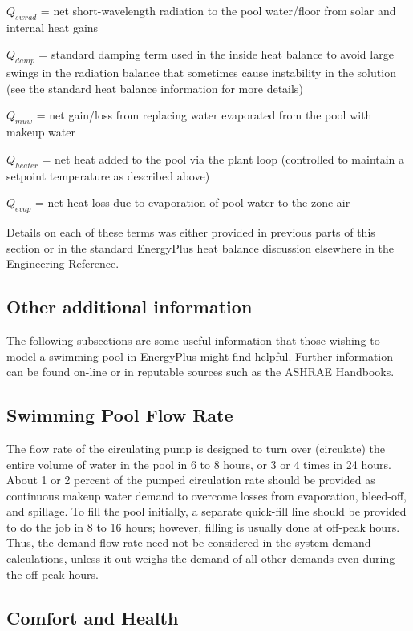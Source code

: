 \(Q_{swrad}\) = net short-wavelength radiation to the pool water/floor from solar and internal heat gains

\(Q_{damp}\) = standard damping term used in the inside heat balance to avoid large swings in the radiation balance that sometimes cause instability in the solution (see the standard heat balance information for more details)

\(Q_{muw}\) = net gain/loss from replacing water evaporated from the pool with makeup water

\(Q_{heater}\) = net heat added to the pool via the plant loop (controlled to maintain a setpoint temperature as described above)

\(Q_{evap}\) = net heat loss due to evaporation of pool water to the zone air

Details on each of these terms was either provided in previous parts of this section or in the standard EnergyPlus heat balance discussion elsewhere in the Engineering Reference.

\subsection{Other additional information}\label{other-additional-information}

The following subsections are some useful information that those wishing to model a swimming pool in EnergyPlus might find helpful. Further information can be found on-line or in reputable sources such as the ASHRAE Handbooks.

\subsection{Swimming Pool Flow Rate}\label{swimming-pool-flow-rate}

The flow rate of the circulating pump is designed to turn over (circulate) the entire volume of water in the pool in 6 to 8 hours, or 3 or 4 times in 24 hours. About 1 or 2 percent of the pumped circulation rate should be provided as continuous makeup water demand to overcome losses from evaporation, bleed-off, and spillage. To fill the pool initially, a separate quick-fill line should be provided to do the job in 8 to 16 hours; however, filling is usually done at off-peak hours. Thus, the demand flow rate need not be considered in the system demand calculations, unless it out-weighs the demand of all other demands even during the off-peak hours.

\subsection{Comfort and Health}\label{comfort-and-health}

